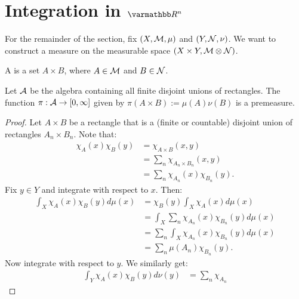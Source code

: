 \section{Integration in $\bfR^n$}

For the remainder of the section, fix $(X,\mathcal{M},\mu)$ and $(Y,\mathcal{N},\nu)$. We want to construct a measure on the measurable space $(X \times Y, \mathcal{M} \otimes \mathcal{N})$.

\begin{definition}
    A  is a set $A \times B$, where $A \in \mathcal{M}$ and $B \in \mathcal{N}$.
\end{definition}

\begin{proposition}
    Let $\mathcal{A}$ be the algebra containing all finite disjoint unions of rectangles. The function $\pi:\mathcal{A} \rightarrow [0,\infty]$ given by $\pi(A \times B) := \mu(A)\nu(B)$ is a premeasure.
\end{proposition}
    \begin{proof}
        Let $A \times B$ be a rectangle that is a (finite or countable) disjoint union of rectangles $A_n \times B_n$. Note that:
            \begin{equation*}
            \begin{split}
                \chi_A(x)\chi_B(y)
                & = \chi_{A \times B}(x,y) \\
                & = \sum_{n}\chi_{A_n \times B_n}(x,y) \\
                & = \sum_{n}\chi_{A_n}(x)\chi_{B_n}(y). 
            \end{split}
            \end{equation*}
        Fix $y \in Y$ and integrate with respect to $x$. Then:
            \begin{equation*}
            \begin{split}
            \int_X \chi_A(x)\chi_B(y) d\mu(x) 
            & = \chi_B(y) \int_X \chi_A(x) d \mu(x) \\
            & = \int_X \sum_{n} \chi_{A_n}(x)\chi_{B_n}(y)d\mu(x) \\
            & = \sum_{n} \int_X \chi_{A_n}(x)\chi_{B_n}(y)d\mu(x) \\
            & = \sum_{n}\mu(A_n)\chi_{B_n}(y).
            \end{split}
            \end{equation*}
        Now integrate with respect to $y$. We similarly get:
            \begin{equation*}
            \begin{split}
                \int_Y \chi_A(x)\chi_B(y) d\nu(y) 
                & = \sum_{n} \chi_{A_n}
            \end{split}
            \end{equation*}
    \end{proof}











